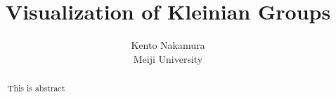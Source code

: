 \documentclass[uplatex, dvipdfmx]{article}
\title{ Visualization of Kleinian Groups }
\author{ Kento Nakamura\\
Meiji University\\
}
\date{}
\begin{document}
\maketitle

\begin{abstract}
This is abstract
\end{abstract}

\clearpage

\tableofcontents

\clearpage









\printbibliography
\end{document}
